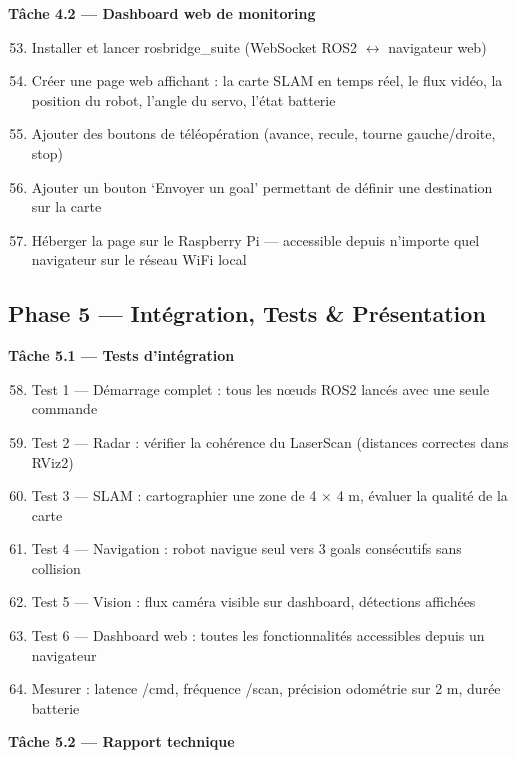 \documentclass[12pt,a4paper]{article}
\begin{document}
\textbf{Tâche 4.2 — Dashboard web de monitoring}

\begin{enumerate}
  \setcounter{enumi}{52}
  \item Installer et lancer rosbridge\_suite (WebSocket ROS2 $\leftrightarrow$ navigateur web)
  \item Créer une page web affichant : la carte SLAM en temps réel, le flux vidéo, la position du robot, l'angle du servo, l'état batterie
  \item Ajouter des boutons de téléopération (avance, recule, tourne gauche/droite, stop)
  \item Ajouter un bouton `Envoyer un goal' permettant de définir une destination sur la carte
  \item Héberger la page sur le Raspberry Pi — accessible depuis n'importe quel navigateur sur le réseau WiFi local
\end{enumerate}

\subsection*{Phase 5 — Intégration, Tests \& Présentation}

\textbf{Tâche 5.1 — Tests d'intégration}

\begin{enumerate}
  \setcounter{enumi}{57}
  \item Test 1 — Démarrage complet : tous les nœuds ROS2 lancés avec une seule commande
  \item Test 2 — Radar : vérifier la cohérence du LaserScan (distances correctes dans RViz2)
  \item Test 3 — SLAM : cartographier une zone de 4 × 4 m, évaluer la qualité de la carte
  \item Test 4 — Navigation : robot navigue seul vers 3 goals consécutifs sans collision
  \item Test 5 — Vision : flux caméra visible sur dashboard, détections affichées
  \item Test 6 — Dashboard web : toutes les fonctionnalités accessibles depuis un navigateur
  \item Mesurer : latence /cmd, fréquence /scan, précision odométrie sur 2 m, durée batterie
\end{enumerate}

\textbf{Tâche 5.2 — Rapport technique}
\end{document}
